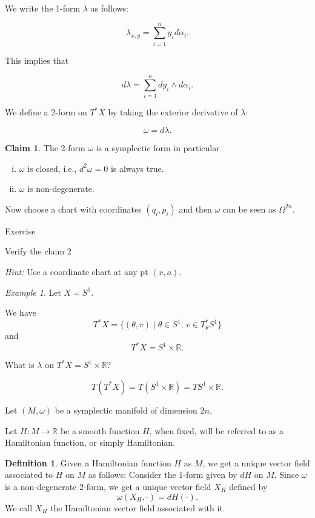 \documentclass[11pt]{article}
\theoremstyle{definition}
\newtheorem{definition}{Definition}[section]
\newtheorem{claim}{Claim}
\theoremstyle{remark}
\newtheorem{example}{Example}[section]
\begin{document}
We write the 1-form $\lambda$ as follows:

\[
\lambda_{x,y} = \sum_{i=1}^n y_i d\alpha_i.
\]

This implies that

\[
d\lambda = \sum_{i=1}^n dy_i \wedge d\alpha_i.
\]

We define a 2-form on $T^*X$ by taking the exterior derivative of $\lambda$:

\[
\omega = d\lambda.
\]

\begin{claim}
The 2-form $\omega$ is a symplectic form in particular
\begin{enumerate}[(i)]
\item $\omega$ is closed, i.e., $d^2\omega = 0$ is always true.
\item $\omega$ is non-degenerate.
\end{enumerate}
\end{claim}

Now choose a chart with coordinates $(q_i, p_i)$ and then $\omega$ can be seen as $\Omega^{2n}$.

Exercise

Verify the claim 2

\textit{Hint:} Use a coordinate chart at any pt $(x, a)$.

\begin{example}\label{ex:tangent_bundle_s1}
Let $X = S^1$.

We have
\[
T^* X = \{( \theta, v ) \mid \theta \in S^1, \, v \in T^*_\theta S^1 \}
\]
and
\[
T^* X = S^1 \times \mathbb{R}.
\]

What is $\lambda$ on $T^* X = S^1 \times \mathbb{R}$?

\[
T(T^* X) = T(S^1 \times \mathbb{R}) = TS^1 \times \mathbb{R}.
\]
\end{example}

Let $(M, \omega)$ be a symplectic manifold of dimension $2n$.

Let $H: M \to \mathbb{R}$ be a smooth function $H$, when fixed, will be referred to as a Hamiltonian function, or simply Hamiltonian.

\begin{definition}\label{def:ham_vector_field}
Given a Hamiltonian function $H$ as $M$, we get a unique vector field associated to $H$ on $M$ as follows:
Consider the $1$-form given by $dH$ on $M$.
Since $\omega$ is a non-degenerate $2$-form, we get a unique vector field $X_H$ defined by
\[
\omega(X_H, \cdot) = dH(\cdot).
\]
We call $X_H$ the Hamiltonian vector field associated with it.
\end{definition}
\end{document}
